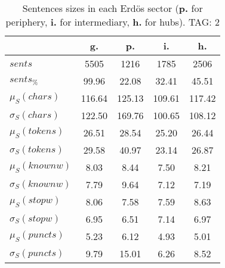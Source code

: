 \begin{table}[h!]
\begin{center}
\begin{tabular}{| l || c | c | c | c |}\hline
 & {\bf g.} & {\bf p.} & {\bf i.} & {\bf h.} \\\hline\hline
$sents$ & 5505  & 1216  & 1785  & 2506 \\
$sents_{\%}$ & 99.96  & 22.08  & 32.41  & 45.51 \\\hline
$\mu_S(chars)$ & 116.64  & 125.13  & 109.61  & 117.42 \\
$\sigma_S(chars)$ & 122.50  & 169.76  & 100.65  & 108.12 \\\hline
$\mu_S(tokens)$ & 26.51  & 28.54  & 25.20  & 26.44 \\
$\sigma_S(tokens)$ & 29.58  & 40.97  & 23.14  & 26.87 \\\hline
$\mu_S(knownw)$ & 8.03  & 8.44  & 7.50  & 8.21 \\
$\sigma_S(knownw)$ & 7.79  & 9.64  & 7.12  & 7.19 \\\hline
$\mu_S(stopw)$ & 8.06  & 7.58  & 7.59  & 8.63 \\
$\sigma_S(stopw)$ & 6.95  & 6.51  & 7.14  & 6.97 \\\hline
$\mu_S(puncts)$ & 5.23  & 6.12  & 4.93  & 5.01 \\
$\sigma_S(puncts)$ & 9.79  & 15.01  & 6.26  & 8.52 \\\hline
\end{tabular}
\caption{Sentences sizes in each Erd\"os sector ({{\bf p.}} for periphery, {{\bf i.}} for intermediary, {{\bf h.}} for hubs). TAG: 2}
\end{center}
\end{table}